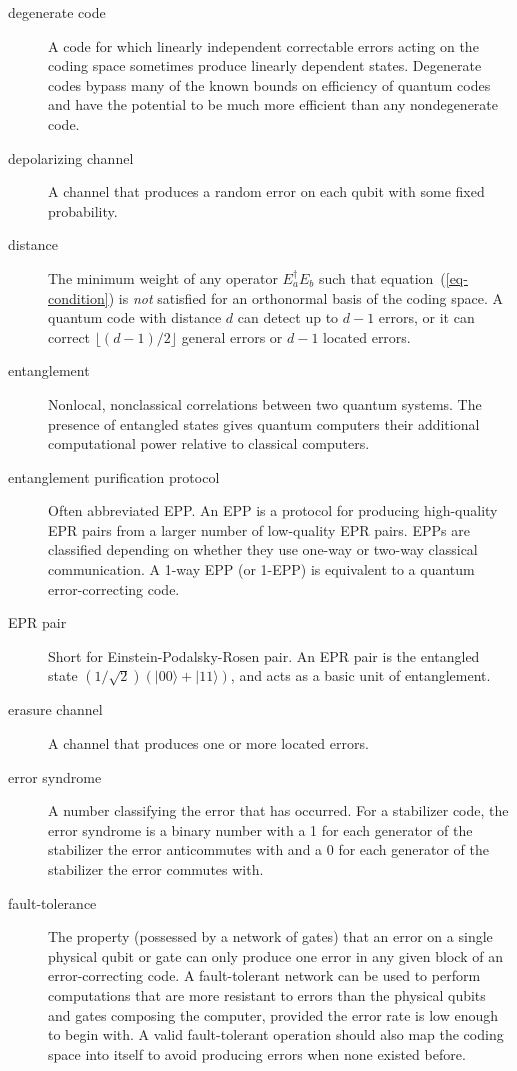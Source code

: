 \documentclass{report}
\newcommand{\ket}[1]{|{#1}\rangle}
\begin{document}
\begin{description}
\item[degenerate code] A code for which linearly independent correctable 
errors acting on the coding space sometimes produce linearly dependent states.  
Degenerate codes bypass many of the known bounds on efficiency of quantum 
codes and have the potential to be much more efficient than any 
nondegenerate code.

\item[depolarizing channel] A channel that produces a random error on each
qubit with some fixed probability.

\item[distance] The minimum weight of any operator $E_a^\dagger E_b$ such that
equation~(\ref{eq-condition}) is {\em not} satisfied for an orthonormal
basis of the coding space.  A quantum code with distance $d$ can detect
up to $d-1$ errors, or it can correct $\lfloor (d-1)/2 \rfloor$ general
errors or $d-1$ located errors. 
 
\item[entanglement] Nonlocal, nonclassical correlations between two quantum
systems.  The presence of entangled states gives quantum computers their
additional computational power relative to classical computers.

\item[entanglement purification protocol] Often abbreviated EPP.  An EPP is
a protocol for producing high-quality EPR pairs from a larger number of
low-quality EPR pairs.  EPPs are classified depending on whether they use
one-way or two-way classical communication.  A 1-way EPP (or 1-EPP) is
equivalent to a quantum error-correcting code.

\item[EPR pair] Short for Einstein-Podalsky-Rosen pair.  An EPR pair is
the entangled state $(1/ \sqrt{2}) \left(\ket{00} + \ket{11} \right)$, and
acts as a basic unit of entanglement.

\item[erasure channel] A channel that produces one or more located errors.

\item[error syndrome] A number classifying the error that has occurred.  For
a stabilizer code, the error syndrome is a binary number with a 1 for each
generator of the stabilizer the error anticommutes with and a 0 for each
generator of the stabilizer the error commutes with.

\item[fault-tolerance] The property (possessed by a network of gates) that an 
error on a single physical qubit or gate can only produce one error in any 
given block of an error-correcting code.  A fault-tolerant network can be
used to perform computations that are more resistant to errors than the
physical qubits and gates composing the computer, provided the error rate
is low enough to begin with.  A valid fault-tolerant operation should also
map the coding space into itself to avoid producing errors when none existed
before.


\end{description}
\end{document}
